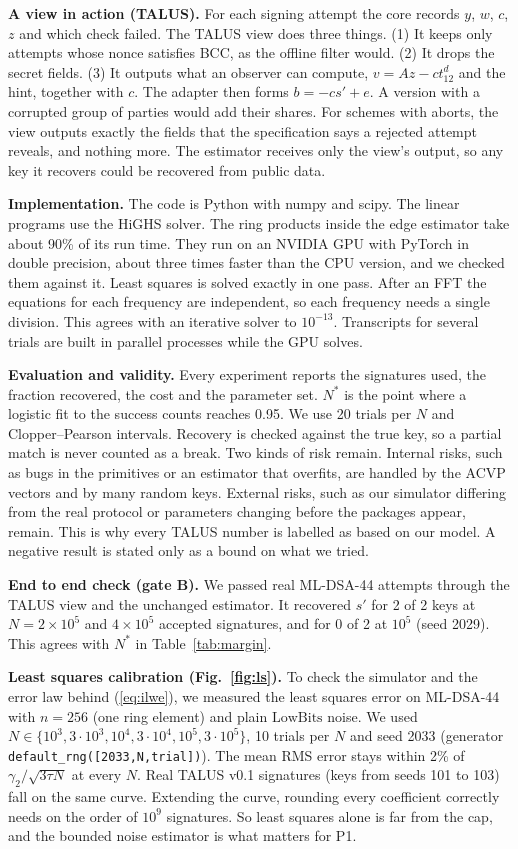 \documentclass[10pt,conference,a4paper]{IEEEtran}
\newcommand{\LB}{\mathrm{LowBits}}
\begin{document}
\textbf{A view in action (TALUS).} For each signing attempt the core records $y$, $w$, $c$, $z$ and which check failed. The
TALUS view does three things. (1) It keeps only attempts whose nonce satisfies BCC, as the offline filter would. (2) It
drops the secret fields. (3) It outputs what an observer can compute, $v=Az-ct_12^d$ and the hint, together with $c$. The
adapter then forms $b=-cs'+e$. A version with a corrupted group of parties would add their shares. For schemes with aborts,
the view outputs exactly the fields that the specification says a rejected attempt reveals, and nothing more. The estimator
receives only the view's output, so any key it recovers could be recovered from public data.

\textbf{Implementation.} The code is Python with numpy and scipy. The linear programs use the HiGHS solver. The ring
products inside the edge estimator take about 90\% of its run time. They run on an NVIDIA GPU with PyTorch in double
precision, about three times faster than the CPU version, and we checked them against it. Least squares is solved exactly
in one pass. After an FFT the equations for each frequency are independent, so each frequency needs a single division. This
agrees with an iterative solver to $10^{-13}$. Transcripts for several trials are built in parallel processes while the GPU
solves.

\textbf{Evaluation and validity.} Every experiment reports the signatures used, the fraction recovered, the cost and the
parameter set. $N^*$ is the point where a logistic fit to the success counts reaches 0.95. We use 20 trials per $N$ and
Clopper--Pearson intervals. Recovery is checked against the true key, so a partial match is never counted as a break. Two
kinds of risk remain. Internal risks, such as bugs in the primitives or an estimator that overfits, are handled by the ACVP
vectors and by many random keys. External risks, such as our simulator differing from the real protocol or parameters
changing before the packages appear, remain. This is why every TALUS number is labelled as based on our model. A negative
result is stated only as a bound on what we tried.

\textbf{End to end check (gate B).} We passed real ML-DSA-44 attempts through the TALUS view and the unchanged estimator.
It recovered $s'$ for 2 of 2 keys at $N=2\times10^5$ and $4\times10^5$ accepted signatures, and for 0 of 2 at $10^5$ (seed
2029). This agrees with $N^*$ in Table~\ref{tab:margin}.

\textbf{Least squares calibration (Fig.~\ref{fig:ls}).} To check the simulator and the error law behind (\ref{eq:ilwe}),
we measured the least squares error on ML-DSA-44 with $n=256$ (one ring element) and plain $\LB$ noise. We used
$N\in\{10^3,3\cdot10^3,10^4,3\cdot10^4,10^5,3\cdot10^5\}$, 10 trials per $N$ and seed 2033 (generator
\texttt{default\_rng([2033,N,trial])}). The mean RMS error stays within 2\% of $\gamma_2/\sqrt{3\tau N}$ at every $N$. Real
TALUS v0.1 signatures (keys from seeds 101 to 103) fall on the same curve. Extending the curve, rounding every coefficient
correctly needs on the order of $10^9$ signatures. So least squares alone is far from the cap, and the bounded noise
estimator is what matters for P1.
\end{document}
